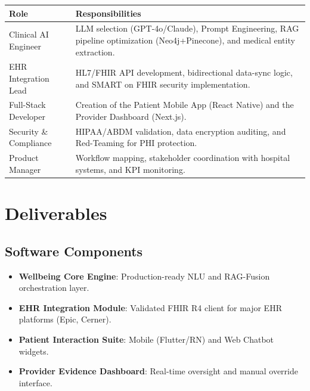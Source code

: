 \documentclass[12pt,a4paper]{article}
\begin{document}
\begin{table}[H]
\centering
\begin{tabularx}{\textwidth}{|l|X|}
\hline
\rowcolor{wellbeingblue} \textbf{\color{white}Role} & \textbf{\color{white}Responsibilities} \\ \hline
Clinical AI Engineer & LLM selection (GPT-4o/Claude), Prompt Engineering, RAG pipeline optimization (Neo4j+Pinecone), and medical entity extraction. \\ \hline
EHR Integration Lead & HL7/FHIR API development, bidirectional data-sync logic, and SMART on FHIR security implementation. \\ \hline
Full-Stack Developer & Creation of the Patient Mobile App (React Native) and the Provider Dashboard (Next.js). \\ \hline
Security \& Compliance & HIPAA/ABDM validation, data encryption auditing, and Red-Teaming for PHI protection. \\ \hline
Product Manager & Workflow mapping, stakeholder coordination with hospital systems, and KPI monitoring. \\ \hline
\end{tabularx}
\end{table}

\section{Deliverables}

\subsection{Software Components}
\begin{itemize}
    \item \textbf{Wellbeing Core Engine}: Production-ready NLU and RAG-Fusion orchestration layer.
    \item \textbf{EHR Integration Module}: Validated FHIR R4 client for major EHR platforms (Epic, Cerner).
    \item \textbf{Patient Interaction Suite}: Mobile (Flutter/RN) and Web Chatbot widgets.
    \item \textbf{Provider Evidence Dashboard}: Real-time oversight and manual override interface.
\end{itemize}
\end{document}
